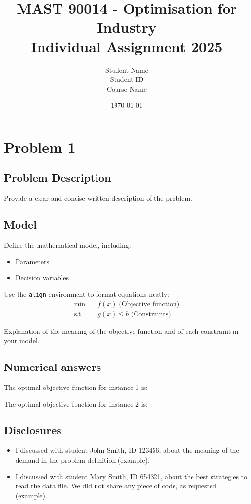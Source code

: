\documentclass[a4paper,12pt]{article}
\title{MAST 90014 - Optimisation for Industry \\ Individual Assignment 2025}
\author{Student Name \\ Student ID \\ Course Name}
\date{\today}
\begin{document}
\maketitle

\section{Problem 1}

\subsection{Problem Description}
Provide a clear and concise written description of the problem.

\subsection{Model}
Define the mathematical model, including:
\begin{itemize}
    \item Parameters
    \item Decision variables
\end{itemize}
Use the \texttt{align} environment to format equations neatly:
\begin{align}
    \min \quad & f(x) \text{ (Objective function)} \\
    \text{s.t.} \quad & g(x) \leq b \text{ (Constraints)}
\end{align}

Explanation of the meaning of the objective function and of each constraint in your model.

\subsection{Numerical answers}

The optimal objective function for instance 1 is: 

\noindent The optimal objective function for instance 2 is: 

\subsection{Disclosures}

\begin{itemize}
    \item I discussed with student John Smith, ID 123456, about the meaning of the demand in the problem definition (example).
    \item I discussed with student Mary Smith, ID 654321, about the best strategies to read the data file. We did not share any piece of code, as requested (example).
\end{itemize}
\end{document}

